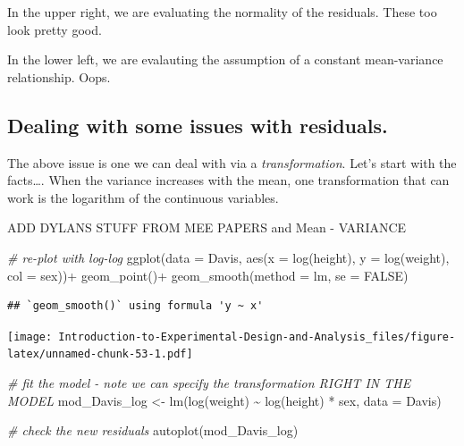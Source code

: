 \documentclass[
]{book}
\newenvironment{Shaded}{\begin{snugshade}}{\end{snugshade}}
\newcommand{\AttributeTok}[1]{\textcolor[rgb]{0.77,0.63,0.00}{#1}}
\newcommand{\CommentTok}[1]{\textcolor[rgb]{0.56,0.35,0.01}{\textit{#1}}}
\newcommand{\ConstantTok}[1]{\textcolor[rgb]{0.00,0.00,0.00}{#1}}
\newcommand{\FunctionTok}[1]{\textcolor[rgb]{0.00,0.00,0.00}{#1}}
\newcommand{\NormalTok}[1]{#1}
\newcommand{\OtherTok}[1]{\textcolor[rgb]{0.56,0.35,0.01}{#1}}
\newcommand{\SpecialCharTok}[1]{\textcolor[rgb]{0.00,0.00,0.00}{#1}}
\begin{document}
In the upper right, we are evaluating the normality of the residuals. These too look pretty good.

In the lower left, we are evalauting the assumption of a constant mean-variance relationship. Oops.

\hypertarget{dealing-with-some-issues-with-residuals.}{%
\subsection{Dealing with some issues with residuals.}\label{dealing-with-some-issues-with-residuals.}}

The above issue is one we can deal with via a \emph{transformation}. Let's start with the facts\ldots. When the variance increases with the mean, one transformation that can work is the logarithm of the continuous variables.

ADD DYLANS STUFF FROM MEE PAPERS and Mean - VARIANCE

\begin{Shaded}
\begin{Highlighting}[]
\CommentTok{\# re{-}plot with log{-}log}
\FunctionTok{ggplot}\NormalTok{(}\AttributeTok{data =}\NormalTok{ Davis, }\FunctionTok{aes}\NormalTok{(}\AttributeTok{x =} \FunctionTok{log}\NormalTok{(height), }\AttributeTok{y =} \FunctionTok{log}\NormalTok{(weight), }\AttributeTok{col =}\NormalTok{ sex))}\SpecialCharTok{+}
  \FunctionTok{geom\_point}\NormalTok{()}\SpecialCharTok{+}
  \FunctionTok{geom\_smooth}\NormalTok{(}\AttributeTok{method =}\NormalTok{ lm, }\AttributeTok{se =} \ConstantTok{FALSE}\NormalTok{)}
\end{Highlighting}
\end{Shaded}

\begin{verbatim}
## `geom_smooth()` using formula 'y ~ x'
\end{verbatim}

\texttt{[image: Introduction-to-Experimental-Design-and-Analysis\_files/figure-latex/unnamed-chunk-53-1.pdf]}

\begin{Shaded}
\begin{Highlighting}[]
\CommentTok{\# fit the model {-} note we can specify the transformation RIGHT IN THE MODEL}
\NormalTok{mod\_Davis\_log }\OtherTok{\textless{}{-}} \FunctionTok{lm}\NormalTok{(}\FunctionTok{log}\NormalTok{(weight) }\SpecialCharTok{\textasciitilde{}} \FunctionTok{log}\NormalTok{(height) }\SpecialCharTok{*}\NormalTok{ sex, }\AttributeTok{data =}\NormalTok{ Davis)}

\CommentTok{\# check the new residuals}
\FunctionTok{autoplot}\NormalTok{(mod\_Davis\_log)}
\end{Highlighting}
\end{Shaded}
\end{document}
